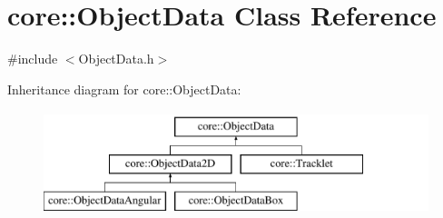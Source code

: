 \hypertarget{classcore_1_1ObjectData}{}\section{core\+:\+:Object\+Data Class Reference}
\label{classcore_1_1ObjectData}


{\ttfamily \#include $<$Object\+Data.\+h$>$}

Inheritance diagram for core\+:\+:Object\+Data\+:\begin{figure}[H]
\begin{center}
\leavevmode
\includegraphics[height=3.000000cm]{classcore_1_1ObjectData}
\end{center}
\end{figure}
